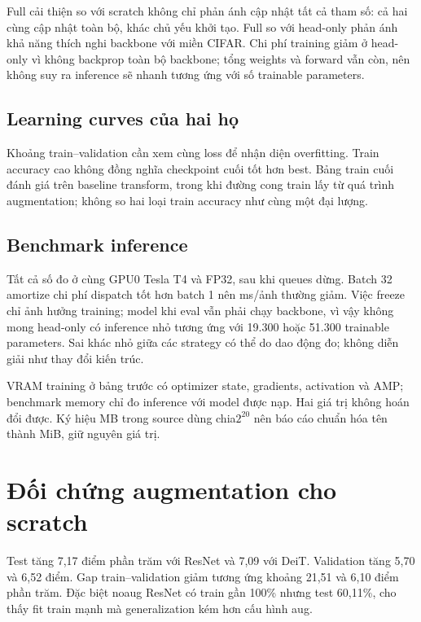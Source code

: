 \documentclass[11pt,a4paper]{article}
\begin{document}
Full cải thiện so với scratch không chỉ phản ánh cập nhật tất cả tham số: cả hai cùng cập nhật toàn bộ, khác chủ yếu khởi tạo. Full so với head-only phản ánh khả năng thích nghi backbone với miền CIFAR. Chi phí training giảm ở head-only vì không backprop toàn bộ backbone; tổng weights và forward vẫn còn, nên không suy ra inference sẽ nhanh tương ứng với số trainable parameters.
\clearpage

\subsection{Learning curves của hai họ}
Khoảng train--validation cần xem cùng loss để nhận diện overfitting. Train accuracy cao không đồng nghĩa checkpoint cuối tốt hơn best. Bảng train cuối đánh giá trên baseline transform, trong khi đường cong train lấy từ quá trình augmentation; không so hai loại train accuracy như cùng một đại lượng.
\clearpage

\subsection{Benchmark inference}

Tất cả số đo ở cùng GPU0 Tesla T4 và FP32, sau khi queues dừng. Batch 32 amortize chi phí dispatch tốt hơn batch 1 nên ms/ảnh thường giảm. Việc freeze chỉ ảnh hưởng training; model khi eval vẫn phải chạy backbone, vì vậy không mong head-only có inference nhỏ tương ứng với 19.300 hoặc 51.300 trainable parameters. Sai khác nhỏ giữa các strategy có thể do dao động đo; không diễn giải như thay đổi kiến trúc.

VRAM training ở bảng trước có optimizer state, gradients, activation và AMP; benchmark memory chỉ đo inference với model được nạp. Hai giá trị không hoán đổi được. Ký hiệu MB trong source dùng chia$2^{20}$ nên báo cáo chuẩn hóa tên thành MiB, giữ nguyên giá trị.
\clearpage

\section{Đối chứng augmentation cho scratch}\label{sec:aug}

Test tăng 7,17 điểm phần trăm với ResNet và 7,09 với DeiT. Validation tăng 5,70 và 6,52 điểm. Gap train--validation giảm tương ứng khoảng 21,51 và 6,10 điểm phần trăm. Đặc biệt noaug ResNet có train gần 100\% nhưng test 60,11\%, cho thấy fit train mạnh mà generalization kém hơn cấu hình aug.
\end{document}
